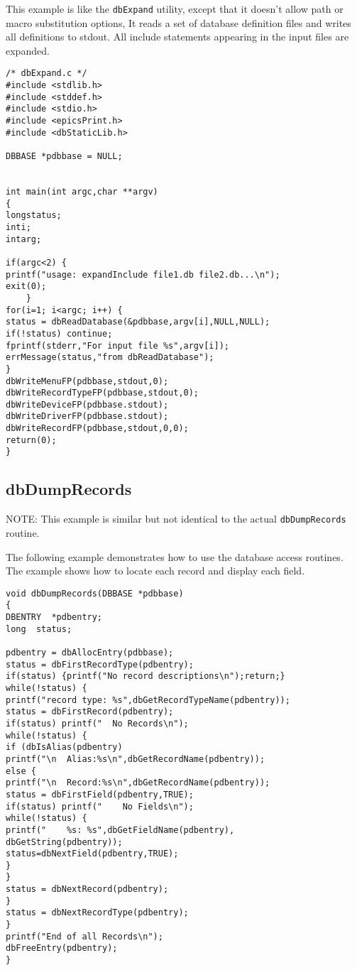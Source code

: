 This example is like the \verb|dbExpand| utility, except that it doesn't allow path or macro substitution options, It reads a set of 
database definition files and writes all definitions to stdout. All include statements appearing in the input files are 
expanded.

\begin{verbatim}/* dbExpand.c */
#include <stdlib.h>
#include <stddef.h>
#include <stdio.h>
#include <epicsPrint.h>
#include <dbStaticLib.h>

DBBASE *pdbbase = NULL;


int main(int argc,char **argv)
{
longstatus;
inti;
intarg;
 
if(argc<2) {
printf("usage: expandInclude file1.db file2.db...\n");
exit(0);
    }
for(i=1; i<argc; i++) {
status = dbReadDatabase(&pdbbase,argv[i],NULL,NULL);
if(!status) continue;
fprintf(stderr,"For input file %s",argv[i]);
errMessage(status,"from dbReadDatabase");
}
dbWriteMenuFP(pdbbase,stdout,0);
dbWriteRecordTypeFP(pdbbase,stdout,0);
dbWriteDeviceFP(pdbbase.stdout);
dbWriteDriverFP(pdbbase.stdout);
dbWriteRecordFP(pdbbase,stdout,0,0);
return(0);
}

\end{verbatim}\subsection{dbDumpRecords}

NOTE: This example is similar but not identical to the actual \verb|dbDumpRecords| routine.

The following example demonstrates how to use the database access routines. The example shows how to locate each 
record and display each field.

\begin{verbatim}void dbDumpRecords(DBBASE *pdbbase)
{
DBENTRY  *pdbentry;
long  status;

pdbentry = dbAllocEntry(pdbbase);
status = dbFirstRecordType(pdbentry);
if(status) {printf("No record descriptions\n");return;}
while(!status) {
printf("record type: %s",dbGetRecordTypeName(pdbentry));
status = dbFirstRecord(pdbentry);
if(status) printf("  No Records\n"); 
while(!status) {
if (dbIsAlias(pdbentry)
printf("\n  Alias:%s\n",dbGetRecordName(pdbentry));
else {
printf("\n  Record:%s\n",dbGetRecordName(pdbentry));
status = dbFirstField(pdbentry,TRUE);
if(status) printf("    No Fields\n");
while(!status) {
printf("    %s: %s",dbGetFieldName(pdbentry),
dbGetString(pdbentry));
status=dbNextField(pdbentry,TRUE);
}
}
status = dbNextRecord(pdbentry);
}
status = dbNextRecordType(pdbentry);
}
printf("End of all Records\n");
dbFreeEntry(pdbentry);
}
\end{verbatim}


